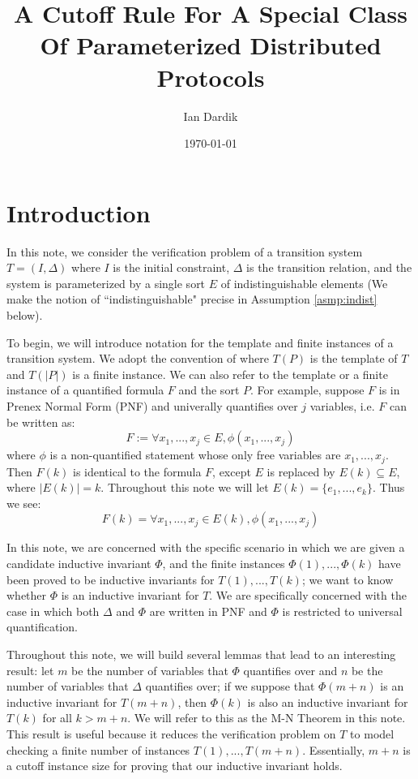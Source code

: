 \documentclass[12pt]{article}
\title{A Cutoff Rule For A Special Class Of Parameterized Distributed Protocols}
\author{Ian Dardik}
\date{\today}
\theoremstyle{definition}
\theoremstyle{remark}
\begin{document}
\maketitle

\section{Introduction}
In this note, we consider the verification problem of a transition system $T=(I,\Delta)$ where $I$ is the initial constraint, $\Delta$ is the transition relation, and the system is parameterized by a single sort $E$ of indistinguishable elements (We make the notion of ``indistinguishable" precise in Assumption \ref{asmp:indist} below).  

To begin, we will introduce notation for the template and finite instances of a transition system.  We adopt the convention of \cite{goel2021symmetry} where $T(P)$ is the template of $T$ and $T(|P|)$ is a finite instance.  We can also refer to the template or a finite instance of a quantified formula $F$ and the sort $P$.  For example, suppose $F$ is in Prenex Normal Form (PNF) and univerally quantifies over $j$ variables, i.e. $F$ can be written as:
$$F := \forall x_1,...,x_j \in E, \phi(x_1,...,x_j)$$
where $\phi$ is a non-quantified statement whose only free variables are $x_1,...,x_j$.  Then $F(k)$ is identical to the formula $F$, except $E$ is replaced by $E(k) \subseteq E$, where $|E(k)|=k$.  Throughout this note we will let $E(k)=\{e_1,...,e_k\}$.  Thus we see:
$$F(k) = \forall x_1,...,x_j \in E(k), \phi(x_1,...,x_j)$$

In this note, we are concerned with the specific scenario in which we are given a candidate inductive invariant $\Phi$, and the finite instances $\Phi(1),...,\Phi(k)$ have been proved to be inductive invariants for $T(1),...,T(k)$; we want to know whether $\Phi$ is an inductive invariant for $T$.  We are specifically concerned with the case in which both $\Delta$ and $\Phi$ are written in PNF and $\Phi$ is restricted to universal quantification.

Throughout this note, we will build several lemmas that lead to an interesting result: let $m$ be the number of variables that $\Phi$ quantifies over and $n$ be the number of variables that $\Delta$ quantifies over; if we suppose that $\Phi(m+n)$ is an inductive invariant for $T(m+n)$, then $\Phi(k)$ is also an inductive invariant for $T(k)$ for all $k>m+n$.  We will refer to this as the M-N Theorem in this note.  This result is useful because it reduces the verification problem on $T$ to model checking a finite number of instances $T(1),...,T(m+n)$.  Essentially, $m+n$ is a cutoff instance size for proving that our inductive invariant holds.
\end{document}

